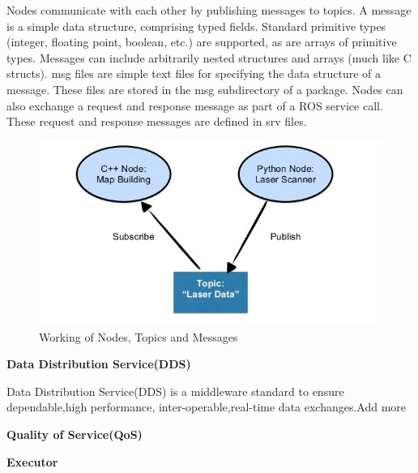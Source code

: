 \documentclass[%
xelatex,
	oneside,		%
	12pt,			%
	parskip=half,	%
	abstracton,
	chapterprefix=true%
    appendixprefix=true]
{scrbook}
\begin{document}
	
	\vspace*{0.5cm}
	Nodes communicate with each other by publishing messages to topics. A message is a simple data structure, comprising typed fields. Standard primitive types (integer, floating point, boolean, etc.) are supported, as are arrays of primitive types. Messages can include arbitrarily nested structures and arrays (much like C structs). msg files are simple text files for specifying the data structure of a message. These files are stored in the msg subdirectory of a package. Nodes can also exchange a request and response message as part of a ROS service call. These request and response messages are defined in srv files.\cite{messages}
	\begin{figure}[ht]
\begin{center}
\includegraphics[scale=1]{fig/node_topic.jpg}
\caption[Working of Nodes, Topics and Messages]{Working of Nodes, Topics and Messages\cite{node_topic}}
\label{fig:node}
\end{center}
\end{figure}  
\vspace*{0.5cm}


	{\bfseries Data Distribution Service(DDS)}
	
	
	\vspace*{0.5cm}
	Data Distribution Service(DDS) is a middleware standard to ensure dependable,high performance, inter-operable,real-time data exchanges.Add more
	\vspace*{0.5cm}
	
	{\bfseries Quality of Service(QoS)}
	
	
	\vspace*{0.5cm}
	

\vspace*{0.5cm}

	{\bfseries Executor}
	
\end{document}
